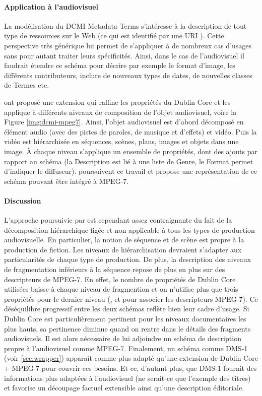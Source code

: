 \paragraph{Application à l'audiovisuel}
La modélisation du DCMI Metadata Terms s'intéresse à la description de tout type de ressources sur le Web (ce qui est identifié par une URI \cite{Berners-Lee1998}).
Cette perspective très générique lui permet de s'appliquer à de nombreux cas d'usages sans pour autant traiter leurs spécificités. 
Ainsi, dans le cas de l'audiovisuel il faudrait étendre ce schéma pour décrire par exemple le format d'image, les différents contributeurs, inclure de nouveaux types de dates, de nouvelles classes de Termes etc.

\cite{Hunter1998} ont proposé une extension qui raffine les propriétés du Dublin Core et les applique à différents niveaux de composition de l'objet audiovisuel, voire la Figure \ref{img:dcmi-mpeg7}.
Ainsi, l'objet audiovisuel est d'abord décomposé en élément audio (avec des pistes de paroles, de musique et d'effets) et vidéo.
Puis la vidéo est hiérarchisée en séquences, scènes, plans, images et objets dans une image.
À chaque niveau s'applique un ensemble de propriétés, dont des ajouts par rapport au schéma (la Description est lié à une liste de Genre, le Format permet d'indiquer le diffuseur).
\cite{Hunter1999} poursuivent ce travail et propose une représentation de ce schéma pouvant être intégré à MPEG-7. 


\paragraph{Discussion}
L'approche poursuivie par \citeauthor{Hunter1999} est cependant assez contraignante du fait de la décomposition hiérarchique figée et non applicable à tous les types de production audiovisuelle.
En particulier, la notion de séquence et de scène est propre à la production de fiction. 
Les niveaux de hiérarchisation devraient s'adapter aux particularités de chaque type de production. 
De plus, la description des niveaux de fragmentation inférieurs à la séquence repose de plus en plus sur des descripteurs de MPEG-7. 
En effet, le nombre de propriétés de Dublin Core utilisées baisse à chaque niveau de fragmention et on n'utilise plus que trois propriétés pour le dernier niveau (,  et  pour associer les descripteurs MPEG-7).
Ce déséquilibre progressif entre les deux schémas reflète bien leur cadre d'usage. 
Si Dublin Core est particulièrement pertinent pour les niveaux documentaires les plus hauts, sa pertinence diminue quand on rentre dans le détails des fragments audiovisuels.
Il est alors nécessaire de lui adjoindre un schéma de description propre à l'audiovisuel comme MPEG-7.
Finalement, un schéma comme DMS-1 (voir \ref{sec:wrapper}) apparaît comme plus adapté qu'une extension de Dublin Core + MPEG-7 pour couvrir ces besoins.
Et ce, d'autant plus, que DMS-1 fournit des informations plus adaptées à l'audiovisuel (ne serait-ce que l'exemple des titres) et favorise un découpage factuel extensible ainsi qu'une description éditoriale.



